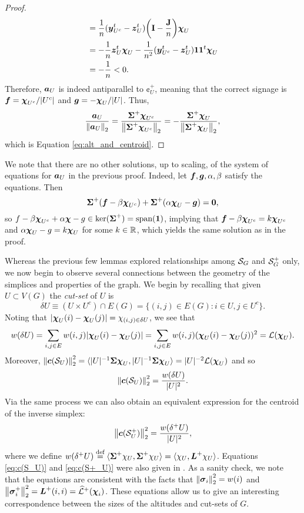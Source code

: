 \begin{proof}
\begin{align*}
&= \frac{1}{n}(\vb*{y}_{U^c}^t-\vb*{z}_U^t)\bigg(\vb{I}-\frac{\vb{J}}{n}\bigg)\boldsymbol{\chi}_U\\ &=-\frac{1}{n}\vb*{z}_U^t\boldsymbol{\chi}_U  - \frac{1}{n^2}(\vb*{y}_{U^c}^t-\vb*{z}_U^t)\vb{1}\vb{1}^t\boldsymbol{\chi}_U\\
&= -\frac{1}{n}<0.
\end{align*}
Therefore, $\vb*{a}_U$ is indeed antiparallel to $\cent^+_U$, meaning that the correct signage is $\vb*{f}=\boldsymbol{\chi}_{U^c}/|U^c|$ and $\vb*{g}=-\boldsymbol{\chi}_U/|U|$. Thus, 
\begin{equation*}
\frac{\vb*{a}_U}{\norm{\vb*{a}_U}_2}=\frac{\boldsymbol{\Sigma}^+\boldsymbol{\chi}_{U^c}}{\norm{ \boldsymbol{\Sigma}^+\boldsymbol{\chi}_{U^c}}_2}=-\frac{\boldsymbol{\Sigma}^+\boldsymbol{\chi}_{U}}{\norm{\boldsymbol{\Sigma}^+\boldsymbol{\chi}_U}_2},
\end{equation*}
which is Equation \eqref{eq:alt_and_centroid}. 
\end{proof}

\begin{remark}
	We note that there are no other solutions, up to scaling, of the system of equations for $\vb*{a}_U$ in the previous proof. Indeed, let $\vb*{f},\vb*{g},\alpha,\beta$ satisfy the equations. 
	Then 
	\[\boldsymbol{\Sigma}^+(\vb*{f}-\beta\boldsymbol{\chi}_{U^c}) + \boldsymbol{\Sigma}^+(\alpha\boldsymbol{\chi}_U-\vb*{g})=\vb{0}, \]
	so $f-\beta\boldsymbol{\chi}_{U^c} + \alpha\boldsymbol{\chi} -g\in \ker(\boldsymbol{\Sigma}^+) = \textnormal{span}(\vb{1})$, implying that $\vb*{f}-\beta\boldsymbol{\chi}_{U^c} = k\boldsymbol{\chi}_{U^c}$ and $\alpha\boldsymbol{\chi}_U -g=k\boldsymbol{\chi}_{U}$ for some $k\in \mathbb{R}$, which yields the same solution as in the proof. 
\end{remark}

Whereas the previous few lemmas explored relationships among $\mathcal{S}_G$ and $\mathcal{S}_G^+$ only, we now begin to observe several connections between the geometry of the simplices and properties of the graph. We begin by recalling that given $U\subset V(G)$ the \emph{cut-set} of $U$ is 
\[\delta U \equiv (U\times U^c)\cap E(G)= \{(i,j)\in E(G): i\in U, j\in U^c\}.\]
Noting that $|\boldsymbol{\chi}_U(i)-\boldsymbol{\chi}_U(j)|=\chi_{(i,j)\in \delta U}$, we see that
\begin{align*}
w(\delta U) = \sum_{i,j\in E} w(i,j)|\boldsymbol{\chi}_U(i)-\boldsymbol{\chi}_U(j)| = \sum_{i,j\in E} w(i,j)(\boldsymbol{\chi}_U(i)-\boldsymbol{\chi}_U(j))^2 = \mathcal{L}(\boldsymbol{\chi}_U). 
\end{align*}
Moreover, $\norm{\vb*{c}(\mathcal{S}_U)}^2_2 = \langle |U|^{-1} \boldsymbol{\Sigma}\boldsymbol{\chi}_U,|U|^{-1} \boldsymbol{\Sigma}\boldsymbol{\chi}_U\rangle = |U|^{-2} \mathcal{L}(\boldsymbol{\chi}_U)$ and so 
\begin{equation}
\label{eq:c(S_U)}
\norm{\vb*{c}(\mathcal{S}_U)}_2^2 = \frac{w(\delta U)}{|U|^2}.
\end{equation}
Via the same process we can also obtain an equivalent expression for the centroid of the inverse simplex: 
\begin{equation}
\label{eq:c(S+_U)}
\norm{\vb*{c}(\mathcal{S}^+_U)}_2^2 = \frac{w(\delta^+ U)}{|U|^2},
\end{equation}
where we define $w(\delta^+U) \overset{\text{def}}{=}  \langle \boldsymbol{\Sigma}^+\chi_U,\boldsymbol{\Sigma}^+\chi_U\rangle=\langle \chi_U,\vb*{L}^+\chi_U\rangle$. Equations \eqref{eq:c(S_U)} and \eqref{eq:c(S+_U)} were also given in \cite{devriendt2018simplex}. As a sanity check, we note that the equations are consistent with the facts that $\norm{\vb*{\sigma}_i}_2^2 = w(i)$ and $\norm{\vb*{\sigma}_i^+}_2^2 = \vb*{L}^+(i,i) = \widehat{\mathcal{L}}^+(\boldsymbol{\chi}_i)$. These equations allow us to give an interesting correspondence between the sizes of the altitudes and cut-sets of $G$. 


